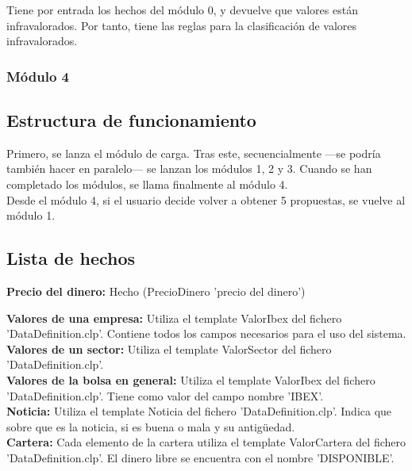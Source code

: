 Tiene por entrada los hechos del módulo 0, y devuelve que valores están infravalorados. Por tanto, tiene las reglas para la clasificación de valores infravalorados.\\

\subsubsection{Módulo 4}

\subsection{Estructura de funcionamiento}

Primero, se lanza el módulo de carga. Tras este, secuencialmente ---se podría también hacer en paralelo--- se lanzan los módulos 1, 2 y 3. Cuando se han completado los módulos, se llama finalmente al módulo 4.\\

Desde el módulo 4, si el usuario decide volver a obtener 5 propuestas, se vuelve al módulo 1.\\

\subsection{Lista de hechos}

\textbf{Precio del dinero:} Hecho (PrecioDinero 'precio del dinero')

\textbf{Valores de una empresa:} Utiliza el template ValorIbex del fichero 'DataDefinition.clp'. Contiene todos los campos necesarios para el uso del sistema.\\

\textbf{Valores de un sector:} Utiliza el template ValorSector del fichero 'DataDefinition.clp'.\\

\textbf{Valores de la bolsa en general:} Utiliza el template ValorIbex del fichero 'DataDefinition.clp'. Tiene como valor del campo nombre 'IBEX'.\\

\textbf{Noticia:} Utiliza el template Noticia del fichero 'DataDefinition.clp'. Indica que sobre que es la noticia, si es buena o mala y su antigüedad.\\

\textbf{Cartera:} Cada elemento de la cartera utiliza el template ValorCartera del fichero 'DataDefinition.clp'. El dinero libre se encuentra con el nombre 'DISPONIBLE'.\\

